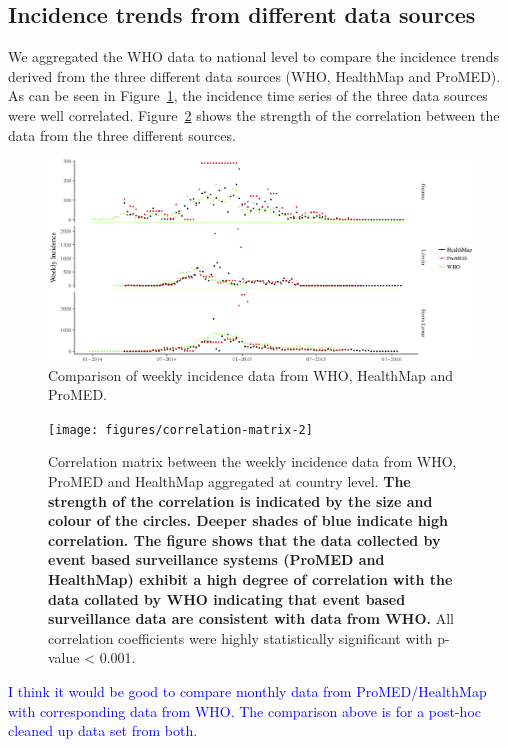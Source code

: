 \documentclass[a4paper,12pt]{article}
\def\sb#1{\textcolor{blue}{#1}}
\begin{document}
\subsection{Incidence trends from different data sources}
We aggregated the WHO data to national level to compare the incidence
trends derived from the three different data sources (WHO, HealthMap
and ProMED). As can be seen in Figure~\ref{fig:incid_comp}, the incidence time series
of the three data sources were well
correlated. Figure~\ref{fig:corrplot} shows the strength of the
correlation between the data from the three different sources.

\begin{figure}
    \centering
        \includegraphics[width=\textwidth]{figures/who_hm_pm_weekly_incid-2}
        \caption{Comparison of weekly incidence data from WHO, HealthMap and ProMED.}
        \label{fig:incid_comp}
  \end{figure}


  \begin{figure}
    \centering
    \texttt{[image: figures/correlation-matrix-2]}
    \caption{Correlation matrix between the weekly incidence data from WHO,
      ProMED and HealthMap aggregated at country level. \textbf{The strength of the correlation is
      indicated by the size and colour of the circles.
      Deeper shades of blue indicate high correlation. The figure
      shows that the data collected by event based surveillance
      systems (ProMED and HealthMap) exhibit a
      high degree of correlation with the data collated by WHO
      indicating that  event based surveillance data are consistent with data
      from WHO.} All
      correlation coefficients were  highly statistically significant
      with p-value < 0.001.}
    \label{fig:corrplot}
  \end{figure}

  \sb{I think it would be good to compare monthly data from
   ProMED/HealthMap with corresponding data from WHO. The comparison
   above is for a post-hoc cleaned up data set from both.} 
\end{document}
